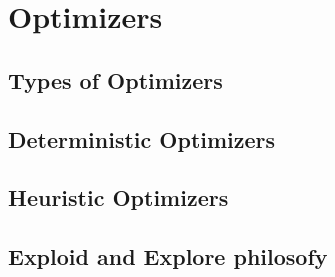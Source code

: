 \documentclass[a4paper, 11pt]{article}
\begin{document}
\section{Optimizers}
\newpage\newpage
\subsection{Types of Optimizers}
\newpage\newpage
\subsection{Deterministic Optimizers}
\newpage\newpage
\subsection{Heuristic Optimizers}
\newpage\newpage
\subsection{Exploid and Explore philosofy}
\newpage 
\end{document}
